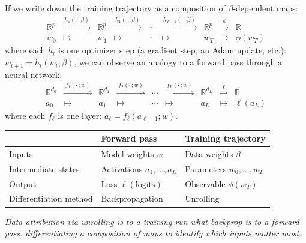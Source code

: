 \documentclass[11pt]{article}
\newcommand{\R}{\mathbb{R}}
\begin{document}
If we write down the training trajectory as a composition of $\beta$-dependent maps:
\[
\begin{array}{ccccccccc}
  \R^p & \xrightarrow{\;h_0(\cdot\,;\beta)\;} & \R^p & \xrightarrow{\;h_1(\cdot\,;\beta)\;} & \cdots & \xrightarrow{\;h_{T-1}(\cdot\,;\beta)\;} & \R^p & \xrightarrow{\;\phi\;} & \R \\[4pt]
  w_0 & \longmapsto & w_1 & \longmapsto & \cdots & \longmapsto & w_T & \longmapsto & \phi(w_T)
\end{array}
\]
where each $h_t$ is one optimizer step (a gradient step, an Adam update, etc.): $w_{t+1} = h_t(w_t;\beta)$, we can observe an analogy to a forward pass through a neural network:
\[
\begin{array}{ccccccccc}
  \R^{d_0} & \xrightarrow{\;f_1(\cdot\,;w)\;} & \R^{d_1} & \xrightarrow{\;f_2(\cdot\,;w)\;} & \cdots & \xrightarrow{\;f_L(\cdot\,;w)\;} & \R^{d_L} & \xrightarrow{\;\ell\;} & \R \\[4pt]
  a_0 & \longmapsto & a_1 & \longmapsto & \cdots & \longmapsto & a_L & \longmapsto & \ell(a_L)
\end{array}
\]
where each $f_\ell$ is one layer: $a_{\ell} = f_\ell(a_{\ell-1}; w)$.
\begin{center}
\small
\begin{tabular}{lll}
\toprule
& \textbf{Forward pass } & \textbf{Training trajectory} \\
\midrule
Inputs & Model weights $w$ & Data weights $\beta$ \\
Intermediate states & Activations $a_1,\dots,a_L$ & Parameters $w_0,\dots,w_T$ \\
Output & Loss $\ell(\text{logits})$ & Observable $\phi(w_T)$ \\
Differentiation method & Backpropagation & Unrolling \\
\bottomrule
\end{tabular}
\end{center}
\emph{Data attribution via unrolling is to a training run what backprop is to a forward pass: differentiating a composition of maps to identify which inputs matter most.}

\end{document}
